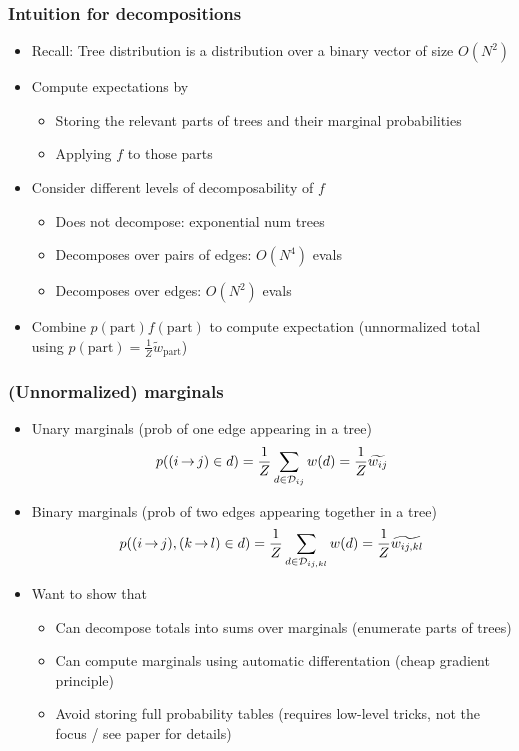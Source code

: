 \documentclass{beamer}
\begin{document}
\begin{frame}
\frametitle{Intuition for decompositions}
\begin{itemize}
\item Recall: Tree distribution is a distribution over a binary vector of size $O(N^2)$
\item Compute expectations by
    \begin{itemize}
        \item Storing the relevant parts of trees and their marginal probabilities
        \item Applying $f$ to those parts
    \end{itemize}
\item Consider different levels of decomposability of $f$
    \begin{itemize}
    \item Does not decompose: exponential num trees
    \item Decomposes over pairs of edges: $O(N^4)$ evals
    \item Decomposes over edges: $O(N^2)$ evals
    \end{itemize}
\item Combine $p(\textrm{part})f(\textrm{part})$ to compute expectation
    (unnormalized total using $p(\textrm{part}) = \frac{1}{Z}\tilde{w}_{\textrm{part}}$)
\end{itemize}
\end{frame}

\begin{frame}
\frametitle{(Unnormalized) marginals}
\begin{itemize}
\item Unary marginals (prob of one edge appearing in a tree)
    $$p({(i\,{\rightarrow}\,j)} \in d) = \frac{1}{Z}\sum_{{d}\in{\mathcal{D}_{ij}}}{w({d})}
    = \frac{1}{Z}{\widetilde{w_{ij}}}$$
\item Binary marginals (prob of two edges appearing together in a tree)
    $$p({(i\,{\rightarrow}\,j)},{(k\,{\rightarrow}\,l)} \in d) =  \frac{1}{Z}\sum_{{d}\in{\mathcal{D}_{ij,kl}}}{w({d})}
    = \frac{1}{Z}{\widetilde{w_{ij,kl}}}$$

\item Want to show that
    \begin{itemize}
    \item Can decompose totals into sums over marginals (enumerate parts of trees)
    \item Can compute marginals using automatic differentation (cheap gradient principle)
    \item Avoid storing full probability tables (requires low-level tricks, not the focus
        / see paper for details)
    \end{itemize}
\end{itemize}
\end{frame}
\end{document}
